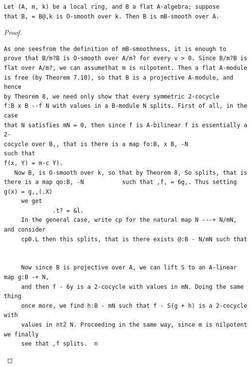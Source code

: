\begin{theorem}\label{mcrt-auto-theorem-28-10}\uses{}
\begin{verbatim}
Let (A, m, k) be a local ring, and B a flat A-algebra; suppose
that B, = B@,k is O-smooth over k. Then B is mB-smooth over A.
\end{verbatim}
\end{theorem}
\begin{proof}
\begin{verbatim}
As one seesfrom the definition of mB-smoothness, it is enough to
prove that B/m?B is O-smooth over A/m? for every v > 0. Since B/m?B is
flat over A/m?, we can assumethat m is nilpotent. Then a flat A-module
is free (by Theorem 7.10), so that B is a projective A-module, and hence
by Theorem 8, we need only show that every symmetric 2-cocycle
f:B x B --f N with values in a B-module N splits. First of all, in the case
that N satisfies mN = 0, then since f is A-bilinear f is essentially a 2-
cocycle over B,, that is there is a map fo:B, x B, -N                such that
f(x, Y) = m-c Y).
   Now B, is O-smooth over k, so that by Theorem 8, So splits, that is
there is a map qo:B, -N           such that ,f, = 6g,. Thus setting g(x) = g,,(.X)
     we get
              .t? = &l.
     In the general case, write cp for the natural map N ---+ N/mN, and consider
     cp0.L then this splits, that is there exists @:B - N/mN such that


     Now since B is projective over A, we can lift S to an A-linear map g:B -+ N,
     and then f - 6y is a 2-cocycle with values in mN. Doing the same thing
     once more, we find h:B - mN such that f - S(g + h) is a 2-cocycle with
     values in nt2 N. Proceeding in the same way, since m is nilpotent we finally
     see that ,f splits.  n
\end{verbatim}
\end{proof}


